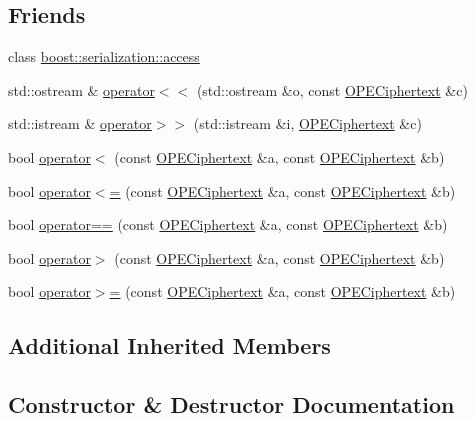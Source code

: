 \subsection*{Friends}
\begin{DoxyCompactItemize}
\item 
class \hyperlink{classOPECiphertext_ac98d07dd8f7b70e16ccb9a01abf56b9c}{boost\+::serialization\+::access}
\item 
std\+::ostream \& \hyperlink{classOPECiphertext_acbdbfe3a8b342ed91b375a30c19423a3}{operator$<$$<$} (std\+::ostream \&o, const \hyperlink{classOPECiphertext}{O\+P\+E\+Ciphertext} \&c)
\item 
std\+::istream \& \hyperlink{classOPECiphertext_a78faeb1ac9b11d0aa4337957b9fba288}{operator$>$$>$} (std\+::istream \&i, \hyperlink{classOPECiphertext}{O\+P\+E\+Ciphertext} \&c)
\item 
bool \hyperlink{classOPECiphertext_a7a856f70b6a7c9c384e5bcc59d4665ca}{operator$<$} (const \hyperlink{classOPECiphertext}{O\+P\+E\+Ciphertext} \&a, const \hyperlink{classOPECiphertext}{O\+P\+E\+Ciphertext} \&b)
\item 
bool \hyperlink{classOPECiphertext_a6e3f45959b24805b5e007867bde5ac52}{operator$<$=} (const \hyperlink{classOPECiphertext}{O\+P\+E\+Ciphertext} \&a, const \hyperlink{classOPECiphertext}{O\+P\+E\+Ciphertext} \&b)
\item 
bool \hyperlink{classOPECiphertext_a434a85cf1acb2e87f59cb598aa67aac1}{operator==} (const \hyperlink{classOPECiphertext}{O\+P\+E\+Ciphertext} \&a, const \hyperlink{classOPECiphertext}{O\+P\+E\+Ciphertext} \&b)
\item 
bool \hyperlink{classOPECiphertext_a5a05c9bf39f65f099132a4cb3c030fc0}{operator$>$} (const \hyperlink{classOPECiphertext}{O\+P\+E\+Ciphertext} \&a, const \hyperlink{classOPECiphertext}{O\+P\+E\+Ciphertext} \&b)
\item 
bool \hyperlink{classOPECiphertext_a2e7887e9daea66096a9526a493cdc023}{operator$>$=} (const \hyperlink{classOPECiphertext}{O\+P\+E\+Ciphertext} \&a, const \hyperlink{classOPECiphertext}{O\+P\+E\+Ciphertext} \&b)
\end{DoxyCompactItemize}
\subsection*{Additional Inherited Members}


\subsection{Constructor \& Destructor Documentation}
\mbox{\label{classOPECiphertext_a03de322445edbdcd1439906f2d853dd0}} 
